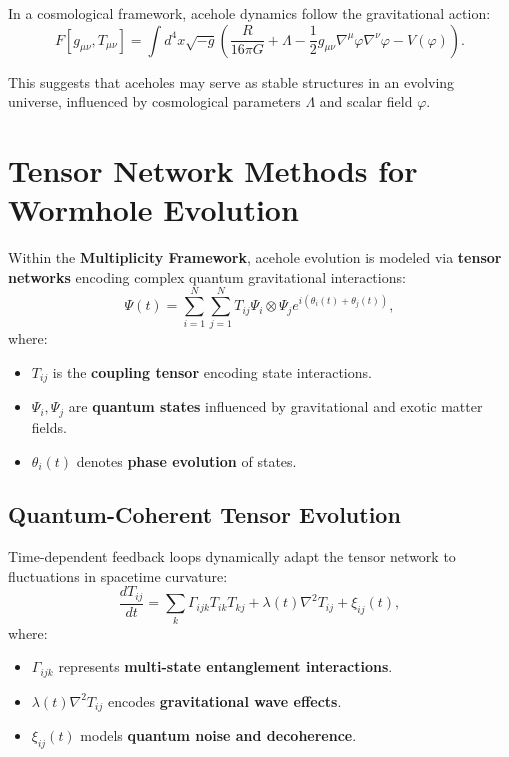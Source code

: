\documentclass{article}
\theoremstyle{plain}
\begin{document}
In a cosmological framework, acehole dynamics follow the gravitational action:
\begin{equation}
F [g_{\mu\nu}, T_{\mu\nu}] = \int d^4x \sqrt{-g} \left( \frac{R}{16\pi G} + \Lambda - \frac{1}{2} g_{\mu\nu} \nabla^\mu \varphi \nabla^\nu \varphi - V(\varphi) \right).
\end{equation}

This suggests that aceholes may serve as stable structures in an evolving universe, influenced by cosmological parameters $\Lambda$ and scalar field $\varphi$.

\section{Tensor Network Methods for Wormhole Evolution}
Within the \textbf{Multiplicity Framework}, acehole evolution is modeled via \textbf{tensor networks} encoding complex quantum gravitational interactions:
\begin{equation}
\Psi(t) = \sum_{i=1}^{N} \sum_{j=1}^{N} T_{ij} \Psi_i \otimes \Psi_j e^{i(\theta_i(t) + \theta_j(t))},
\end{equation}
where:
\begin{itemize}
    \item $T_{ij}$ is the \textbf{coupling tensor} encoding state interactions.
    \item $\Psi_i, \Psi_j$ are \textbf{quantum states} influenced by gravitational and exotic matter fields.
    \item $\theta_i(t)$ denotes \textbf{phase evolution} of states.
\end{itemize}

\subsection{Quantum-Coherent Tensor Evolution}
Time-dependent feedback loops dynamically adapt the tensor network to fluctuations in spacetime curvature:
\begin{equation}
\frac{d T_{ij}}{dt} = \sum_{k} \Gamma_{ijk} T_{ik} T_{kj} + \lambda(t) \nabla^2 T_{ij} + \xi_{ij}(t),
\end{equation}
where:
\begin{itemize}
    \item $\Gamma_{ijk}$ represents \textbf{multi-state entanglement interactions}.
    \item $\lambda(t) \nabla^2 T_{ij}$ encodes \textbf{gravitational wave effects}.
    \item $\xi_{ij}(t)$ models \textbf{quantum noise and decoherence}.
\end{itemize}
\end{document}
